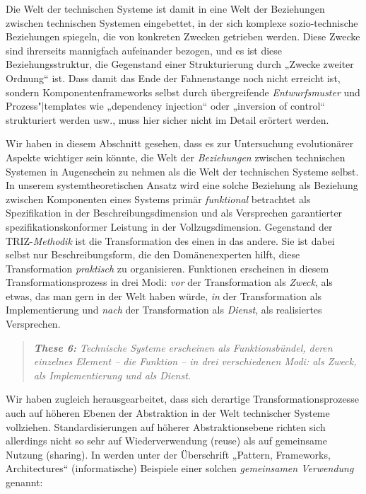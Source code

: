 \documentclass[12pt,a4paper]{article}
\begin{document}
Die Welt der technischen Systeme ist damit in eine Welt der Beziehungen
zwischen technischen Systemen eingebettet, in der sich komplexe
sozio-technische Beziehungen spiegeln, die von konkreten Zwecken getrieben
werden. Diese Zwecke sind ihrerseits mannigfach aufeinander bezogen, und es
ist diese Beziehungsstruktur, die Gegenstand einer Strukturierung durch
„Zwecke zweiter Ordnung“ ist.  Dass damit das Ende der Fahnenstange noch nicht
erreicht ist, sondern Komponentenframeworks selbst durch übergreifende
\emph{Entwurfsmuster} \cite{Gamma1995} und Prozess"|templates wie „dependency
injection“ oder „inversion of control“ strukturiert werden usw., muss hier
sicher nicht im Detail erörtert werden.

Wir haben in diesem Abschnitt gesehen, dass es zur Untersuchung evolutionärer
Aspekte wichtiger sein könnte, die Welt der \emph{Beziehungen} zwischen
technischen Systemen in Augenschein zu nehmen als die Welt der technischen
Systeme selbst. In unserem systemtheoretischen Ansatz wird eine solche
Beziehung als Beziehung zwischen Komponenten eines Systems primär
\emph{funktional} betrachtet als Spezifikation in der Beschreibungsdimension
und als Versprechen garantierter spezifikationskonformer Leistung in der
Vollzugsdimension. Gegenstand der TRIZ-\emph{Methodik} ist die Transformation
des einen in das andere. Sie ist dabei selbst nur Beschreibungsform, die den
Domänenexperten hilft, diese Transformation \emph{praktisch} zu organisieren.
Funktionen erscheinen in diesem Transformationsprozess in drei Modi:
\emph{vor} der Transformation als \emph{Zweck}, als etwas, das man gern in der
Welt haben würde, \emph{in} der Transformation als Implementierung und
\emph{nach} der Transformation als \emph{Dienst}, als realisiertes
Versprechen. 
\begin{quote}\it
  \textbf{These 6:} Technische Systeme erscheinen als Funktionsbündel, deren
  einzelnes Element -- die Funktion -- in drei verschiedenen Modi: als Zweck,
  als Implementierung und als Dienst.
\end{quote}
Wir haben zugleich herausgearbeitet, dass sich derartige
Transformationsprozesse auch auf höheren Ebenen der Abstraktion in der Welt
technischer Systeme vollziehen. Standardisierungen auf höherer
Abstraktionsebene richten sich allerdings nicht so sehr auf Wiederverwendung
(reuse) als auf gemeinsame Nutzung (sharing). In \cite[Kap.9 ]{Szyperski2002}
werden unter der Überschrift „Pattern, Frameworks, Architectures“
(informatische) Beispiele einer solchen \emph{gemeinsamen Verwendung} genannt:
\end{document}
